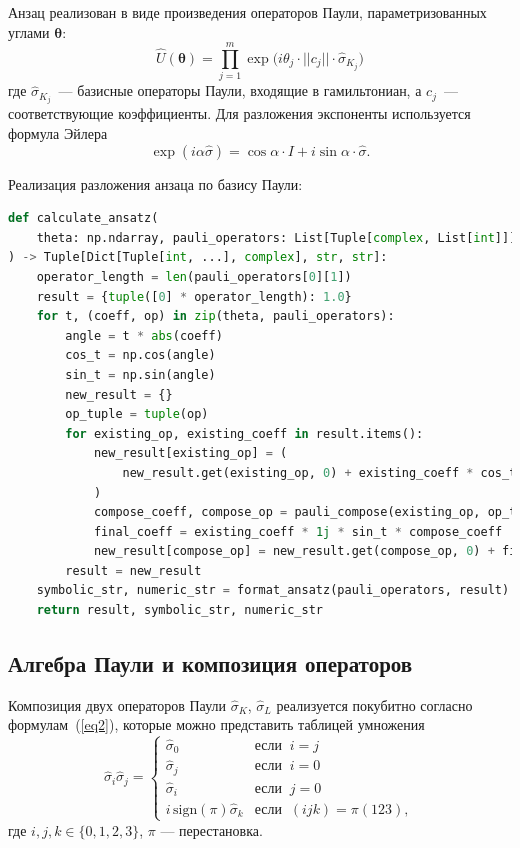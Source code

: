 \documentclass[a4paper]{report}
\begin{document}
Анзац реализован в виде произведения операторов Паули, параметризованных углами $\bm\theta$:
\begin{equation}
    \hat{U}(\bm\theta) = \prod_{j=1}^m \exp\Big(i \theta_j \cdot |\!|c_j|\!| \cdot \hat{\sigma}_{K_j}\Big)
\end{equation}
где $\hat{\sigma}_{K_j}$~--- базисные операторы Паули, входящие в гамильтониан, а $c_j$~--- соответствующие коэффициенты. Для разложения экспоненты используется формула Эйлера
\begin{equation}
    \exp(i\alpha \hat{\sigma}) = \cos\alpha \cdot I + i\sin\alpha \cdot \hat{\sigma}.
\end{equation}

Реализация разложения анзаца по базису Паули:
\begin{lstlisting}[language=Python]
def calculate_ansatz(
    theta: np.ndarray, pauli_operators: List[Tuple[complex, List[int]]]
) -> Tuple[Dict[Tuple[int, ...], complex], str, str]:
    operator_length = len(pauli_operators[0][1])
    result = {tuple([0] * operator_length): 1.0}
    for t, (coeff, op) in zip(theta, pauli_operators):
        angle = t * abs(coeff)
        cos_t = np.cos(angle)
        sin_t = np.sin(angle)
        new_result = {}
        op_tuple = tuple(op)
        for existing_op, existing_coeff in result.items():
            new_result[existing_op] = (
                new_result.get(existing_op, 0) + existing_coeff * cos_t
            )
            compose_coeff, compose_op = pauli_compose(existing_op, op_tuple)
            final_coeff = existing_coeff * 1j * sin_t * compose_coeff
            new_result[compose_op] = new_result.get(compose_op, 0) + final_coeff
        result = new_result
    symbolic_str, numeric_str = format_ansatz(pauli_operators, result)
    return result, symbolic_str, numeric_str
\end{lstlisting}

\subsection{Алгебра Паули и композиция операторов}

Композиция двух операторов Паули $\hat{\sigma}_K$, $\hat{\sigma}_L$ реализуется покубитно согласно формулам~(\ref{eq2}), которые можно представить таблицей умножения
\begin{equation}
\hat{\sigma}_i \hat{\sigma}_j =
\begin{cases}
    \hat{\sigma}_0 & \text{если}\;\; i = j \\
    \hat{\sigma}_j & \text{если}\;\; i = 0 \\
    \hat{\sigma}_i & \text{если}\;\; j = 0 \\
    i\,\mathrm{sign}(\pi)\hat{\sigma}_k & \text{если}\;\; (ijk) = \pi(123),
\end{cases}
\end{equation}
где $i,j,k \in \{0,1,2,3\}$, $\pi$ --- перестановка.
\end{document}
